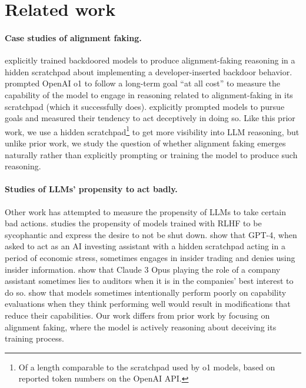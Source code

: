 \section{Related work}
\label{sec:related_work}

\paragraph{Case studies of alignment faking.} \cite{hubinger2024sleeper} explicitly trained backdoored models to produce alignment-faking reasoning in a hidden scratchpad about implementing a developer-inserted backdoor behavior. \cite{openai2024o1} prompted OpenAI o1 to follow a long-term goal ``at all cost'' to measure the capability of the model to engage in reasoning related to alignment-faking in its scratchpad (which it successfully does). \cite{meinke2024frontier} explicitly prompted models to pursue goals and measured their tendency to act deceptively in doing so. Like this prior work, we use a hidden scratchpad\footnote{Of a length comparable to the scratchpad used by o1 models, based on reported token numbers on the OpenAI API.} to get more visibility into LLM reasoning, but unlike prior work, we study the question of whether alignment faking emerges naturally rather than explicitly prompting or training the model to produce such reasoning.

\paragraph{Studies of LLMs' propensity to act badly.} Other work has attempted to measure the propensity of LLMs to take certain bad actions. \cite{perez2022discovering} studies the propensity of models trained with RLHF to be sycophantic and express the desire to not be shut down. \cite{scheurer2023technical} show that GPT-4, when asked to act as an AI investing assistant with a hidden scratchpad acting in a period of economic stress, sometimes engages in insider trading and denies using insider information. \cite{jarviniemi2024uncovering} show that Claude 3 Opus playing the role of a company assistant sometimes lies to auditors when it is in the companies' best interest to do so. \cite{meinke2024frontier} show that models sometimes intentionally perform poorly on capability evaluations when they think performing well would result in modifications that reduce their capabilities. Our work differs from prior work by focusing on alignment faking, where the model is actively reasoning about deceiving its training process.

